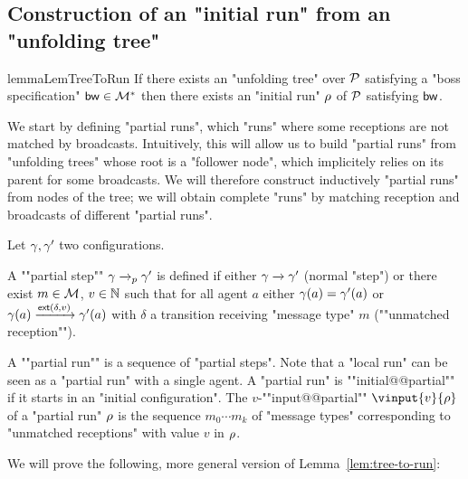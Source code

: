 \subsection{Construction of an "initial run" from an "unfolding tree"}
\label{app:tree-to-run}

\begin{restatable}{lemma}{LemTreeToRun}
	\label{lem:tree-to-run}
	If there exists an "unfolding tree" over $\mathcal{P}$ satisfying a "boss specification" $\mathsf{bw} \in \mathcal{M}^*$ then there exists an "initial run" $\rho$ of $\mathcal{P}$ satisfying $\mathsf{bw}$.
\end{restatable}

We start by defining "partial runs", which "runs" where some receptions are not matched by broadcasts. Intuitively, this will allow us to build "partial runs" from "unfolding trees" whose root is a "follower node", which implicitely relies on its parent for some broadcasts. We will therefore construct inductively "partial runs" from nodes of the tree; we will obtain complete "runs" by matching reception and broadcasts of different "partial runs".

\begin{definition}
	Let $\gamma, \gamma'$ two configurations. 
	
	A ""partial step"" $\gamma \xrightarrow{}_{p} \gamma'$ is defined if either $\gamma \xrightarrow{} \gamma'$ (normal "step") or there exist $m \in \mathcal{M}$, $v\in \mathbb{N}$ such that for all agent $a$ either $\gamma(a) = \gamma'(a)$ or $\gamma(a) \xrightarrow{\mathsf{ext}(\delta,v)} \gamma'(a)$ with $\delta$ a transition receiving "message type" $m$ (""unmatched reception"").
	
	\AP A ""partial run"" is a sequence of "partial steps".
	Note that a "local run" can be seen as a "partial run" with a single agent. A "partial run" is ""initial@@partial"" if it starts in an "initial configuration".
	\AP The $v$-""input@@partial"" $\vinput{v}{\run}$ of a "partial run" $\rho$ is the sequence $m_0 \cdots m_k$ of "message types" corresponding to "unmatched receptions" with value $v$ in $\rho$.
\end{definition}


We will prove the following, more general version of Lemma~\ref{lem:tree-to-run}:

